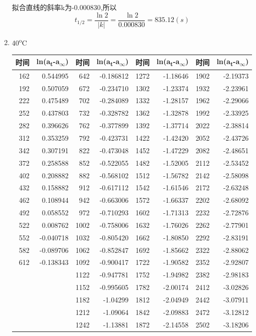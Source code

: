 \documentclass[11pt]{report}
\begin{document}
\begin{enumerate}
\begin{verbatim}
\end{verbatim}
拟合直线的斜率k为-0.000830,所以
\[
t_{1/2}=\frac{\ln 2}{|k|}=\frac{\ln 2}{0.000830}=835.12(s)
\]
\item 40\textsuperscript{o}C
\label{sec:org0705058}
\begin{center}
\begin{tabular}{rrrrrrrr}
时间 & ln(a\textsubscript{t}-a\textsubscript{\(\infty\)}) & 时间 & ln(a\textsubscript{t}-a\textsubscript{\(\infty\)}) & 时间 & ln(a\textsubscript{t}-a\textsubscript{\(\infty\)}) & 时间 & ln(a\textsubscript{t}-a\textsubscript{\(\infty\)})\\
\hline
162 & 0.544995 & 642 & -0.186812 & 1272 & -1.18646 & 1902 & -2.19373\\
192 & 0.507059 & 672 & -0.234710 & 1302 & -1.23374 & 1932 & -2.23961\\
222 & 0.475489 & 702 & -0.284089 & 1332 & -1.28157 & 1962 & -2.29066\\
252 & 0.437803 & 732 & -0.328782 & 1362 & -1.32878 & 1992 & -2.33925\\
282 & 0.396626 & 762 & -0.377899 & 1392 & -1.37714 & 2022 & -2.38814\\
312 & 0.353259 & 792 & -0.423731 & 1422 & -1.42420 & 2052 & -2.43726\\
342 & 0.307191 & 822 & -0.473048 & 1452 & -1.47229 & 2082 & -2.48651\\
372 & 0.258588 & 852 & -0.522055 & 1482 & -1.52005 & 2112 & -2.53452\\
402 & 0.208882 & 882 & -0.568102 & 1512 & -1.56782 & 2142 & -2.58098\\
432 & 0.158882 & 912 & -0.617112 & 1542 & -1.61546 & 2172 & -2.63248\\
462 & 0.108944 & 942 & -0.663006 & 1572 & -1.66337 & 2202 & -2.68092\\
492 & 0.058552 & 972 & -0.710293 & 1602 & -1.71313 & 2232 & -2.72876\\
522 & 0.008762 & 1002 & -0.758006 & 1632 & -1.76026 & 2262 & -2.77901\\
552 & -0.040718 & 1032 & -0.805420 & 1662 & -1.80850 & 2292 & -2.83191\\
582 & -0.089706 & 1062 & -0.852847 & 1692 & -1.85662 & 2322 & -2.88062\\
612 & -0.138343 & 1092 & -0.900417 & 1722 & -1.90582 & 2352 & -2.92807\\
 &  & 1122 & -0.947781 & 1752 & -1.94982 & 2382 & -2.98183\\
 &  & 1152 & -0.995605 & 1782 & -2.00174 & 2412 & -3.02826\\
 &  & 1182 & -1.04299 & 1812 & -2.04949 & 2442 & -3.07911\\
 &  & 1212 & -1.09064 & 1842 & -2.09883 & 2472 & -3.12812\\
 &  & 1242 & -1.13881 & 1872 & -2.14558 & 2502 & -3.18206\\
\end{tabular}
\end{center}


\end{enumerate}
\end{document}
